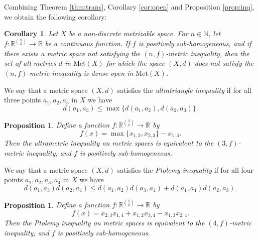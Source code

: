 \documentclass[a4paper, 12pt]{amsart}
\theoremstyle{plain}
\newtheorem{prop}[thm]{Proposition}
\newtheorem{cor}[thm]{Corollary}
\theoremstyle{definition}
\theoremstyle{remark}
\newcommand{\nn}{\mathbb{N}}
\newcommand{\rr}{\mathbb{R}}
\newcommand{\met}[1]{\mathrm{Met}(#1)}
\begin{document}
Combining Theorem \ref{thm:trans},  
Corollary \ref{cor:open} 
and Proposition \ref{prop:inq}, 
we obtain the following corollary:
\begin{cor}\label{cor:inqopen}
Let 
$X$ 
be a non-discrete metrizable space. 
For 
$n\in \nn$, 
let 
$f\colon  \rr^{\binom{n}{2}}\to \rr$ 
be a continuous function. 
If
 $f$ 
 is positively sub-homogeneous,  
and if  there exists a metric space not satisfying the 
$(n, f)$-metric inequality, 
then the set of all metrics 
$d$
 in 
$\met{X}$ 
for which the space 
$(X, d)$
does not satisfy the 
$(n, f)$-metric inequality is 
dense open in 
$\met{X}$. 
\end{cor}





We  say that 
a metric space 
$(X, d)$ 
satisfies the 
\emph{ultratriangle inequality} 
if 
for all three points 
$a_{1}, a_{2}, a_{3}$ 
in 
$X$ 
we have 
\[
	d(a_{1}, a_{3})\le \max\{d(a_{1}, a_{2}), d(a_{2}, a_{3})\}. 
\]



\begin{prop}
Define a function 
$f\colon  \rr^{\binom{3}{2}}\to \rr$ 
by 
\[
	f(x)=\max\{x_{1, 2}, x_{2, 3}\}-x_{1, 3}. 
\]
Then 
the ultrametric  inequality on metric spaces is equivalent to the 
$(3, f)$-metric inequality,  
and 
$f$
 is positively sub-homogeneous. 
\end{prop}


We  say that a metric space  
$(X, d)$ 
satisfies the 
\emph{Ptolemy inequality} if 
for all four points 
$a_{1}, a_{2}, a_{3}, a_{4}$ 
in 
$X$ 
we have 
\[
	d(a_{1}, a_{3})d(a_{2}, a_{4})\le d(a_{1}, a_{2})d(a_{3}, a_{4})+d(a_{1}, a_{4})d(a_{2}, a_{3}). 
\]
\begin{prop}
Define a function  
$f\colon  \rr^{\binom{4}{2}}\to \rr$ 
by 
\[
	f(x)=x_{2, 3}x_{1, 4}+x_{1,2}x_{3, 4}-x_{1, 3}x_{2, 4}. 
\]
Then 
the Ptolemy inequality on metric spaces  is equivalent to the  
$(4, f)$-metric inequality, 
 and 
$f$ 
is positively sub-homogeneous. 
\end{prop}
\end{document}
